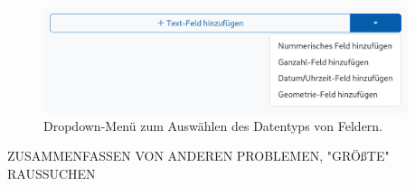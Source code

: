 \begin{frame}

  \begin{figure}
    \begin{center}
      \includegraphics[width=0.95\textwidth]{assets/datatype-dropdown.png}
    \end{center}
    \caption{Dropdown-Menü zum Auswählen des Datentyps von Feldern.}
  \end{figure}

\end{frame}

\begin{frame}

  ZUSAMMENFASSEN VON ANDEREN PROBLEMEN, "GRÖßTE" RAUSSUCHEN

\end{frame}
